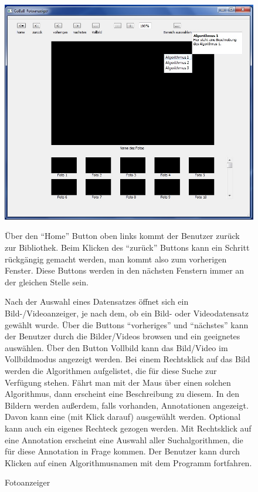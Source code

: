 \begin{figure}
\includegraphics[width=1\linewidth]{img/Fotoanzeiger}
\caption{Fotoanzeiger}
\label{fig:fotoanzeiger}
\vspace{10pt}
Über den \enquote{Home} Button oben links kommt der Benutzer zurück zur Bibliothek. Beim Klicken des \enquote{zurück} Buttons kann ein Schritt rückgängig gemacht werden, man kommt also zum vorherigen Fenster. Diese Buttons werden in den nächsten Fenstern immer an der gleichen Stelle sein.

Nach der Auswahl eines Datensatzes öffnet sich ein Bild-/Videoanzeiger, je nach dem, ob ein Bild- oder Videodatensatz gewählt wurde. Über die Buttons \enquote{vorheriges} und \enquote{nächstes} kann der Benutzer durch die Bilder/Videos browsen und ein geeignetes auswählen. Über den Button Vollbild kann das Bild/Video im Vollbildmodus angezeigt werden.
Bei einem Rechtsklick auf das Bild werden die Algorithmen aufgelistet, die für diese Suche zur Verfügung stehen. Fährt man mit der Maus über einen solchen Algorithmus, dann erscheint eine Beschreibung zu diesem.
In den Bildern werden außerdem, falls vorhanden, Annotationen angezeigt. Davon kann eine (mit Klick darauf) ausgewählt werden. Optional kann auch ein eigenes Rechteck gezogen werden. Mit Rechtsklick auf eine Annotation erscheint eine Auswahl aller Suchalgorithmen, die für diese Annotation in Frage kommen. Der Benutzer kann durch Klicken auf einen Algorithmusnamen mit dem Programm fortfahren.
\end{figure}

